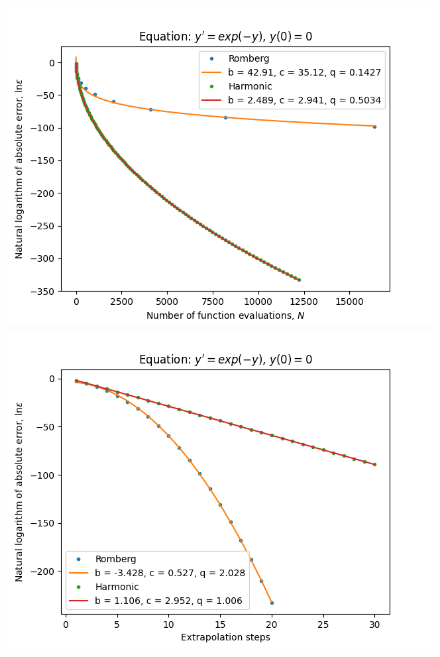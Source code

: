 \begin{figure}[H]
\centering
\begin{minipage}{0.45\textwidth}
\centering
\includegraphics[scale=0.45]{../results/emr_plots/ln_e0_hp_trend.png}
\end{minipage}
\begin{minipage}{0.45\textwidth}
\centering
\includegraphics[scale=0.45]{../results/emr_plots/ln_e0_hp_steps.png}
\end{minipage}
\end{figure}

